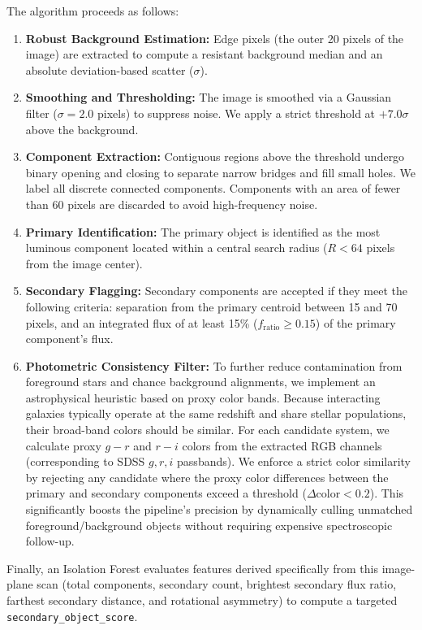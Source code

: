 \documentclass[twocolumn]{aastex631}
\begin{document}
The algorithm proceeds as follows:
\begin{enumerate}
    \item \textbf{Robust Background Estimation:} Edge pixels (the outer 20 pixels of the image) are extracted to compute a resistant background median and an absolute deviation-based scatter ($\sigma$).
    \item \textbf{Smoothing and Thresholding:} The image is smoothed via a Gaussian filter ($\sigma=2.0$ pixels) to suppress noise. We apply a strict threshold at $+7.0\sigma$ above the background.
    \item \textbf{Component Extraction:} Contiguous regions above the threshold undergo binary opening and closing to separate narrow bridges and fill small holes. We label all discrete connected components. Components with an area of fewer than 60 pixels are discarded to avoid high-frequency noise.
    \item \textbf{Primary Identification:} The primary object is identified as the most luminous component located within a central search radius ($R < 64$ pixels from the image center).
    \item \textbf{Secondary Flagging:} Secondary components are accepted if they meet the following criteria: separation from the primary centroid between 15 and 70 pixels, and an integrated flux of at least 15\% ($f_{\text{ratio}} \ge 0.15$) of the primary component's flux.
    \item \textbf{Photometric Consistency Filter:} To further reduce contamination from foreground stars and chance background alignments, we implement an astrophysical heuristic based on proxy color bands. Because interacting galaxies typically operate at the same redshift and share stellar populations, their broad-band colors should be similar. For each candidate system, we calculate proxy $g-r$ and $r-i$ colors from the extracted RGB channels (corresponding to SDSS $g, r, i$ passbands). We enforce a strict color similarity by rejecting any candidate where the proxy color differences between the primary and secondary components exceed a threshold ($\Delta \text{color} < 0.2$). This significantly boosts the pipeline's precision by dynamically culling unmatched foreground/background objects without requiring expensive spectroscopic follow-up.
\end{enumerate}

Finally, an Isolation Forest evaluates features derived specifically from this image-plane scan (total components, secondary count, brightest secondary flux ratio, farthest secondary distance, and rotational asymmetry) to compute a targeted \texttt{secondary\_object\_score}.
\end{document}
